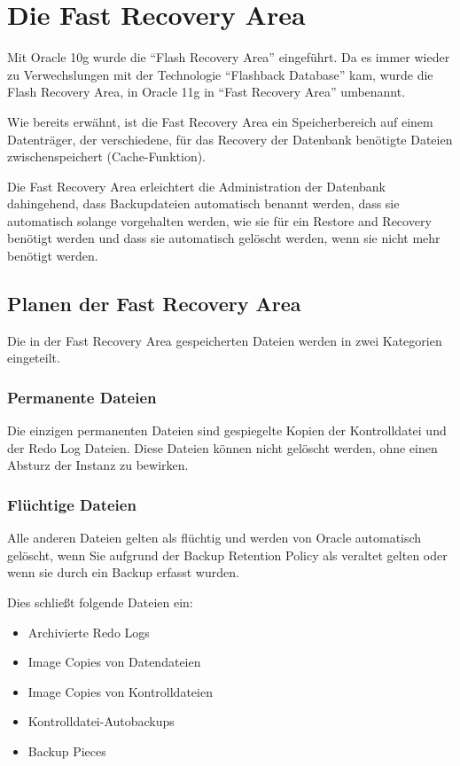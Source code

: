     \section{Die Fast Recovery Area}
      \label{configureflashrecoveryarea}
      \begin{merke}
        Mit Oracle 10g wurde die \enquote{Flash Recovery Area} eingeführt. Da es immer wieder zu Verwechslungen mit der Technologie \enquote{Flashback Database} kam, wurde die Flash Recovery Area, in Oracle 11g in \enquote{Fast Recovery Area} umbenannt.
      \end{merke}
      Wie bereits erwähnt, ist die Fast Recovery Area ein Speicherbereich auf einem Daten\-träger, der verschiedene, für das Recovery der Datenbank benötigte Dateien zwischenspeichert (Cache-Funktion).

      Die Fast Recovery Area erleichtert die Administration der Datenbank dahingehend, dass Backupdateien automatisch benannt werden, dass sie automatisch solange vorgehalten werden, wie sie für ein Restore and Recovery benötigt werden und dass sie automatisch gelöscht werden, wenn sie nicht mehr benötigt werden.
      \subsection{Planen der Fast Recovery Area}
        Die in der Fast Recovery Area gespeicherten Dateien werden in zwei Kategorien eingeteilt.
        \subsubsection{Permanente Dateien}
          Die einzigen permanenten Dateien sind gespiegelte Kopien der Kontrolldatei und der Redo Log Dateien. Diese Dateien können nicht gelöscht werden, ohne einen Absturz der Instanz zu bewirken.
        \subsubsection{Flüchtige Dateien}
          Alle anderen Dateien gelten als flüchtig und werden von Oracle automatisch gelöscht, wenn Sie aufgrund der Backup Retention Policy als veraltet gelten oder wenn sie durch ein Backup erfasst wurden.

          Dies schließt folgende Dateien ein:
          \begin{itemize}
            \item Archivierte Redo Logs
            \item Image Copies von Datendateien
            \item Image Copies von Kontrolldateien
            \item Kontrolldatei-Autobackups
            \item Backup Pieces
          \end{itemize}
